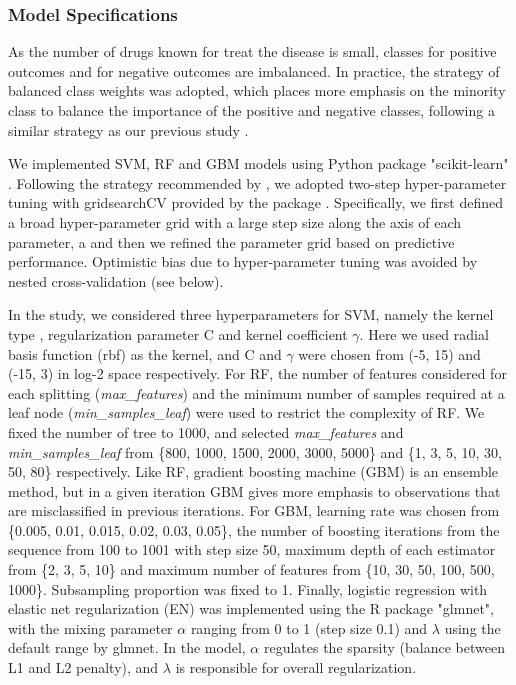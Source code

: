     \subsubsection{Model Specifications}
      As the number of drugs known for treat the disease is small, classes for positive outcomes and for negative outcomes are imbalanced. In practice, the strategy of balanced class weights was adopted, which places more emphasis on the minority class to balance the importance of the positive and negative classes, following a similar strategy as our previous study \cite{zhao2018drug}. 
      
      We implemented SVM, RF and GBM models using Python package "scikit-learn" \cite{pedregosa2011scikit}. Following the strategy recommended by \cite{hsu2003practical}, we adopted two-step hyper-parameter tuning with gridsearchCV provided by the package \cite{pedregosa2011scikit}.  Specifically, we first defined a broad hyper-parameter grid with a large step size along the axis of each parameter, a and then we refined the parameter grid based on predictive performance. Optimistic bias due to hyper-parameter tuning was avoided by nested cross-validation (see below).
   
      In the study, we considered three hyperparameters for SVM, namely the kernel type , regularization parameter C and kernel coefficient $\gamma$. Here we used radial basis function (rbf) as the kernel, and C and $\gamma$ were chosen from (-5, 15) and (-15, 3) in log-2 space respectively. For RF, the number of features considered for each splitting (\textit{max\_features}) and the minimum number of samples required at a leaf node (\textit{min\_samples\_leaf}) were used to restrict the complexity of RF. We fixed the number of tree to 1000, and selected \textit{max\_features} and \textit{min\_samples\_leaf} from \{800, 1000, 1500, 2000, 3000, 5000\} and \{1, 3, 5, 10, 30, 50, 80\} respectively. Like RF, gradient boosting machine (GBM) is an ensemble method, but in a given iteration GBM gives more emphasis to observations that are misclassified in previous iterations.  For GBM, learning rate was chosen from \{0.005, 0.01, 0.015, 0.02, 0.03, 0.05\}, the number of boosting iterations from the sequence from 100 to 1001 with step size 50, maximum depth of each estimator from \{2, 3, 5, 10\} and maximum number of features from \{10, 30, 50, 100, 500, 1000\}. Subsampling proportion was fixed to 1. Finally, logistic regression with elastic net regularization (EN) was implemented using the R package "glmnet", with the mixing parameter $\alpha$ ranging from 0 to 1 (step size 0.1) and $\lambda$ using the default range by glmnet. In the model, $\alpha$ regulates the sparsity (balance between L1 and L2 penalty), and $\lambda$ is responsible for overall regularization. 
  
